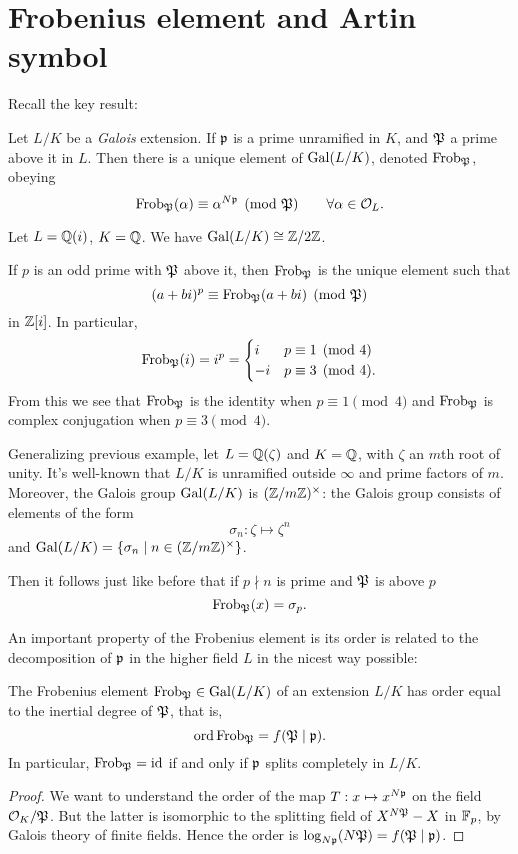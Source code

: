 \section{Frobenius element and Artin symbol}
Recall the key result:
\begin{theorem}
	Let $L/K$ be a \emph{Galois} extension.
	If $\mathfrak p$ is a prime unramified in $K$,
	and $\mathfrak P$ a prime above it in $L$.
	Then there is a unique element of $\operatorname{Gal}(L/K)$,
	denoted $\mathrm{Frob}_\mathfrak P$, obeying
	\[ \mathrm{Frob}_\mathfrak P(\alpha) \equiv \alpha^{N\mathfrak p} \pmod{\mathfrak P}
		\qquad \forall \alpha \in \mathcal O_L. \]
\end{theorem}
\begin{example}
	Let $L = \mathbb Q(i)$, $K = \mathbb Q$.
	We have $\operatorname{Gal}(L/K) \cong \mathbb Z/2\mathbb Z$.

	If $p$ is an odd prime with $\mathfrak P$ above it,
	then $\mathrm{Frob}_\mathfrak P$ is the unique element such that
	\[ (a+bi)^p \equiv \mathrm{Frob}_\mathfrak P(a+bi) \pmod{\mathfrak P} \]
	in $\mathbb Z[i]$. In particular,
	\[ \mathrm{Frob}_\mathfrak P(i) = i^p = 
		\begin{cases}
			i & p \equiv 1 \pmod 4 \\
			-i & p \equiv 3 \pmod 4.
		\end{cases}
	\]
	From this we see that $\mathrm{Frob}_\mathfrak P$ is the identity when $p \equiv 1 \pmod 4$
	and $\mathrm{Frob}_\mathfrak P$ is complex conjugation when $p \equiv 3 \pmod 4$.
\end{example}
\begin{example}
	Generalizing previous example, let $L = \mathbb Q(\zeta)$ and $K = \mathbb Q$,
	with $\zeta$ an $m$th root of unity.
	It's well-known that $L/K$ is unramified outside $\infty$
	and prime factors of $m$.
	Moreover, the Galois group $\operatorname{Gal}(L/K)$ is $(\mathbb Z/m\mathbb Z)^\times$:
	the Galois group consists of elements of the form 
	\[ \sigma_n : \zeta \mapsto \zeta^n \]
	and $\operatorname{Gal}(L/K) = \left\{ \sigma_n \mid n \in (\mathbb Z/m\mathbb Z)^\times \right\}$.

	Then it follows just like before that
	if $p \nmid n$ is prime and $\mathfrak P$ is above $p$
	\[ \mathrm{Frob}_\mathfrak P(x) = \sigma_p. \]
\end{example}

An important property of the Frobenius element is its order
is related to the decomposition of $\mathfrak p$ in the higher field $L$
in the nicest way possible:
\begin{lemma}
	The Frobenius element $\mathrm{Frob}_\mathfrak P \in \operatorname{Gal}(L/K)$
	of an extension $L/K$ has order equal to the
	inertial degree of $\mathfrak P$, that is,
	\[ \operatorname{ord} \mathrm{Frob}_\mathfrak P = f(\mathfrak P \mid \mathfrak p). \]
	In particular, $\mathrm{Frob}_\mathfrak P = \mathrm{id}$ if and only if $\mathfrak p$
	splits completely in $L/K$.
\end{lemma}
\begin{proof}
	We want to understand the order of the map $T : x \mapsto x^{N\mathfrak p}$ on
	the field $\mathcal O_K / \mathfrak P$.
	But the latter is isomorphic to the splitting field 
	of $X^{N\mathfrak P} - X$ in $\mathbb F_p$, by Galois theory of finite fields.
	Hence the order is $\log_{N\mathfrak p} (N\mathfrak P) = f(\mathfrak P \mid \mathfrak p)$.
\end{proof}

